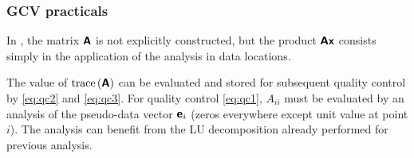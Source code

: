 \subsubsection{\diva GCV practicals}

In \diva, the matrix $\mbox{\boldmath $ \protect\mathsf{A} $}$ is not explicitly constructed, but the product $\mbox{\boldmath $ \protect\mathsf{A} $} \mbox{\boldmath $ \protect\mathsf{x} $}$ consists simply in the application of the analysis in data locations.

The value of $\mathrm{trace}\left( \mbox{\boldmath $ \protect\mathsf{A} $} \right)$ can be evaluated and stored for subsequent quality control by \eqref{eq:qc2} and \eqref{eq:qc3}.
For quality control \eqref{eq:qc1}, $A_{ii}$ must be evaluated by an analysis of the pseudo-data vector $\mbox{\boldmath $ \protect\mathsf{e} $}_i$ (zeros everywhere except unit value at point $i$). The analysis can benefit from the \textsf{LU} decomposition already performed for previous analysis.


